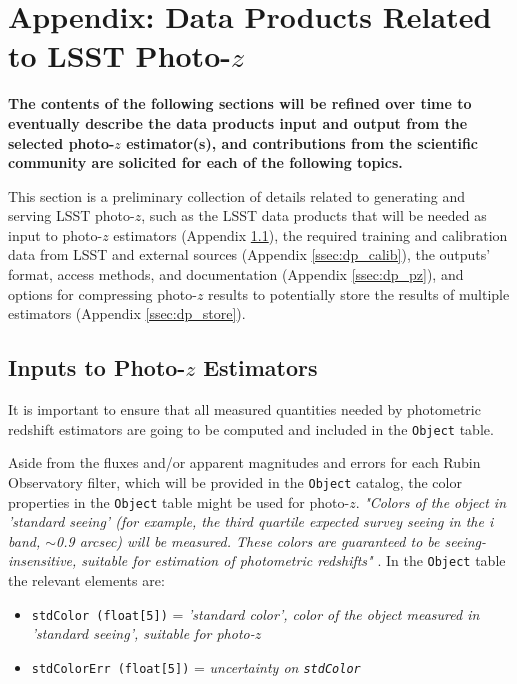 \documentclass[DM,lsstdraft,toc]{lsstdoc}
\begin{document}
\clearpage
\section{Appendix: Data Products Related to LSST Photo-$z$}\label{sec:dp}

\textbf{The contents of the following sections will be refined over time to eventually describe the data products input and output from the selected photo-$z$ estimator(s), and contributions from the scientific community are solicited for each of the following topics.}

This section is a preliminary collection of details related to generating and serving LSST photo-$z$, such as the LSST data products that will be needed as input to photo-$z$ estimators (Appendix \ref{ssec:dp_objvals}), the required training and calibration data from LSST and external sources (Appendix \ref{ssec:dp_calib}), the outputs' format, access methods, and documentation (Appendix \ref{ssec:dp_pz}), and options for compressing photo-$z$ results to potentially store the results of multiple estimators (Appendix \ref{ssec:dp_store}).


\subsection{Inputs to Photo-$z$ Estimators}\label{ssec:dp_objvals}

It is important to ensure that all measured quantities needed by photometric redshift estimators are going to be computed and included in the {\tt Object} table. 

Aside from the fluxes and/or apparent magnitudes and errors for each Rubin Observatory filter, which will be provided in the {\tt Object} catalog, the color properties in the {\tt Object} table might be used for photo-$z$. {\it "Colors of the object in 'standard seeing' (for example, the third quartile expected survey seeing in the i band, $\sim$0.9 arcsec) will be measured. These colors are guaranteed to be seeing-insensitive, suitable for estimation of photometric redshifts"} . In the {\tt Object} table the relevant elements are:
\vspace{-15pt}
\begin{itemize}
\item \texttt{stdColor (float[5])} = {\it 'standard color', color of the object measured in 'standard seeing', suitable for photo-$z$}
\item \texttt{stdColorErr (float[5])} = {\it uncertainty on \texttt{stdColor}}
\end{itemize}
\end{document}

